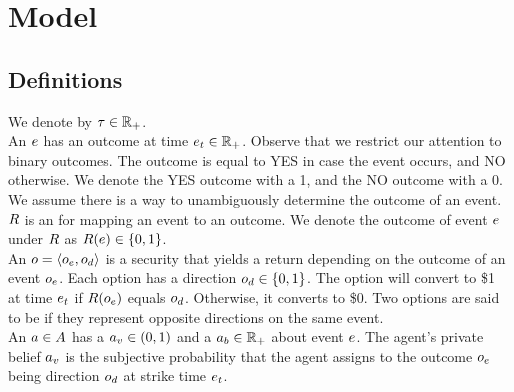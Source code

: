 \section{Model}

\subsection{Definitions}

We denote  by $\tau\in\mathbb{R}_+$. \\

An  $e$ has an outcome at time $e_t \in \mathbb{R}_+$. 
Observe that we restrict our attention to binary outcomes. 
The outcome is equal to YES in case the event occurs, and NO otherwise. 
We denote the YES outcome with a 1, and the NO outcome with a 0.
We assume there is a way to unambiguously determine the outcome of an event. \\

$R$ is an  for mapping an event to an outcome.
We denote the outcome of event $e$ under $R$ as 
$R(e) \in \{0,1\}$.\\

An  $o = \left<o_e, o_d\right>$ is a security that yields a return depending on 
the outcome of an event $o_e$. Each option has a direction 
$o_d \in \{0, 1\}$. 
The option will convert to \$1 at time $e_t$ if $R(o_e)$ equals 
$o_d$. Otherwise, it converts to \$0. Two options are said to be
 if they represent opposite directions on the same event.\\ 


An  $a\in A$ has a  
$a_v \in (0,1)$ 
and a  $a_b \in \mathbb{R}_+$ about event $e$.
The agent's private belief $a_v$ 
is the subjective probability that the agent
assigns to the outcome $o_e$ being direction $o_d$
at strike time $e_t$. \\

